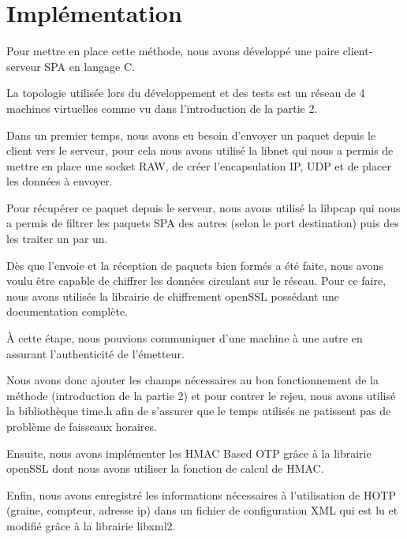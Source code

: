 \chapter{Implémentation}

Pour mettre en place cette méthode, nous avons développé une paire client-serveur SPA en langage C.

La topologie utilisée lors du développement et des tests est un réseau de 4 machines virtuelles comme vu dans l'introduction de la partie 2.

Dans un premier temps, nous avons eu besoin d'envoyer un paquet depuis le client vers le serveur, pour cela nous avons utilisé la libnet qui nous a permis de mettre en place une socket RAW, de créer l'encapsulation IP, UDP et de placer les données à envoyer.

Pour récupérer ce paquet depuis le serveur, nous avons utilisé la libpcap qui nous a permis de filtrer les paquets SPA des autres (selon le port destination) puis des les traiter un par un.

Dès que l'envoie et la réception de paquets bien formés a été faite, nous avons voulu être capable de chiffrer les données circulant sur le réseau. Pour ce faire, nous avons utilisés la librairie de chiffrement openSSL possédant une documentation complète.

À cette étape, nous pouvions communiquer d'une machine à une autre en assurant l'authenticité de l'émetteur.

Nous avons donc ajouter les champs nécessaires au bon fonctionnement de la méthode (introduction de la partie 2) et pour contrer le rejeu, nous avons utilisé la bibliothèque time.h afin de s'assurer que le temps utilisés ne patissent pas de problème de faisseaux horaires.

Ensuite, nous avons implémenter les HMAC Based OTP grâce à la librairie openSSL dont nous avons utiliser la fonction de calcul de HMAC.

Enfin, nous avons enregistré les informations nécessaires à l'utilisation de HOTP (graine, compteur, adresse ip) dans un fichier de configuration XML qui est lu et modifié grâce à la librairie libxml2.
